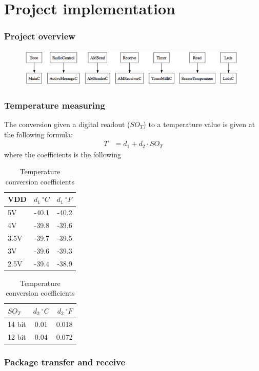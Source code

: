 \documentclass{beamer}
\begin{document}
\section{Project implementation}
\begin{frame}
\frametitle{Project overview}
\begin{figure}[htbp]
   \centering
   \includegraphics[width=11cm]{SWgraph.png} 
\end{figure}

\end{frame}

\begin{frame}
\frametitle{Temperature measuring}
The conversion given a digital readout ($SO_{T}$) to a temperature value is given at the following formula:
\begin{align*}
	T &= d_{1} + d_{2} \cdot SO_{T}
\end{align*}
where the coefficients is the following
\begin{table}[ht]
\centering
\begin{tabular}{ | l | c | r | }
	\hline
	VDD & $d_{1} \ ^{\circ}  C$ & $d_{1} \ ^{\circ}  F$ \\
	\hline \hline
	5V & -40.1 & -40.2 \\
	\hline
	4V & -39.8 & -39.6 \\
	\hline
	3.5V & -39.7 & -39.5 \\
	\hline
	3V & -39.6 & -39.3 \\
	\hline
	2.5V & -39.4 & -38.9 \\
	\hline
\end{tabular}
\begin{tabular}{ | l | c | r | }
	\hline
	$SO_{T}$ & $d_{2}  \ ^{\circ}C$ & $d_{2} \ ^{\circ} F$ \\
	\hline \hline
	14 bit & 0.01 & 0.018 \\
	\hline
	12 bit & 0.04 & 0.072\\
	\hline
\end{tabular}
\caption{Temperature conversion coefficients}
\label{table:temperature}
\end{table}

\end{frame}

\begin{frame}
\frametitle{Package transfer and receive}

\end{frame}
\end{document}
